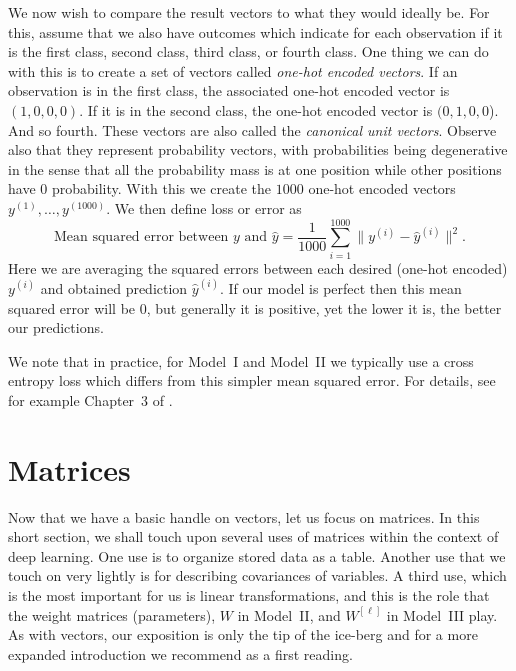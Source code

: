 \documentclass[12pt]{article}
\begin{document}
We now wish to compare the result vectors to what they would ideally be. For this, assume that we also have outcomes which indicate for each observation if it is the first class, second class, third class, or fourth class. One thing we can do with this is to create a set of vectors called {\em one-hot encoded vectors}. If an observation is in the first class, the associated one-hot encoded vector is $(1,0,0,0)$. If it is in the second class, the one-hot encoded vector is $(0,1,0,0$). And so fourth. These vectors are also called the {\em canonical unit vectors}. Observe also that they represent probability vectors, with probabilities being degenerative in the sense that all the probability mass is at one position while other positions have $0$ probability. With this we create the $1000$ one-hot encoded vectors $y^{(1)}, \ldots, y^{(1000)}$. We then define loss or error as
%
\begin{equation}
 \label{eq:mse-error-class-1000}   
\text{Mean squared error between $y$ and $\hat{y}$} = \frac{1}{1000}\sum_{i=1}^{1000} \| y^{(i)} - \hat{y}^{(i)} \|^2.
\end{equation}
%
Here we are averaging the squared errors between each desired (one-hot encoded) $y^{(i)}$ and obtained prediction $\hat{y}^{(i)}$. If our model is perfect then this mean squared error will be $0$, but generally it is positive, yet the lower it is, the better our predictions.

We note that in practice, for Model~I and Model~II we typically use a cross entropy loss which differs from this simpler mean squared error. For details, see for example Chapter~3 of  \cite{LiquetMokaNazarathy2024DeepLearning}.

\section{Matrices}
\label{sec:matrices}

Now that we have a basic handle on vectors, let us focus on matrices. In this short section, we shall touch upon several uses of matrices within the context of deep learning. One use is to organize stored data as a table. Another use that we touch on very lightly is for describing covariances of variables. A third use, which is the most important for us is linear transformations, and this is the role that the weight matrices (parameters), $W$ in Model~II, and $W^{[\ell]}$ in Model~III play. As with vectors, our exposition is only the tip of the ice-berg and for a more expanded introduction we recommend \cite{boyd2018introduction} as a first reading.
\end{document}

